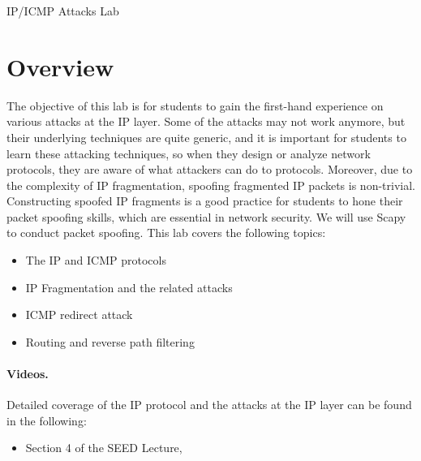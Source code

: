 



\newcommand{\ipFigs}{./Figs}






\begin{center}
{\LARGE IP/ICMP Attacks Lab}
\end{center}



\section{Overview}

The objective of this lab is for students to gain the first-hand experience 
on various attacks at the IP layer. Some of the attacks may not work anymore,
but their underlying techniques are quite generic, and it
is important for students to learn these attacking techniques, so when they design
or analyze network protocols, they are aware of what attackers can do to protocols.
Moreover, due to the complexity of IP fragmentation, spoofing fragmented IP packets
is non-trivial.  Constructing spoofed 
IP fragments is a good practice for students to hone their
packet spoofing skills, which are essential in network security.  
We will use Scapy to conduct packet spoofing.  
This lab covers the following topics:

\begin{itemize}[noitemsep]
\item The IP and ICMP protocols
\item IP Fragmentation and the related attacks
\item ICMP redirect attack
\item Routing and reverse path filtering 
\end{itemize}



\paragraph{Videos.}
Detailed coverage of the IP protocol and the attacks at the IP layer can be found 
in the following:

\begin{itemize}
\item Section 4 of the SEED Lecture, \seedisvideo
\end{itemize}


